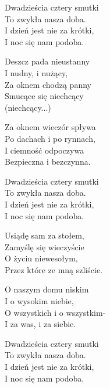\begin{text}
    Dwadzieścia cztery smutki\\
    To zwykła nasza doba.\\
    I dzień jest nie za krótki,\\
    I noc się nam podoba.

    Deszcz pada nieustanny\\
    I nudny, i nużący,\\
    Za oknem chodzą panny\\
    Smucące się niechcący\\
    (niechcący...)

    Za oknem wieczór spływa\\
    Po dachach i po rynnach,\\
    I ciemność odpoczywa\\
    Bezpieczna i bezczynna.

    Dwadzieścia cztery smutki\\
    To zwykła nasza doba.\\
    I dzień jest nie za krótki,\\
    I noc się nam podoba.

    Usiądę sam za stołem,\\
    Zamyślę się wieczyście\\
    O życiu niewesołym,\\
    Przez które ze mną szliście.

    O naszym domu niskim\\
    I o wysokim niebie,\\
    O wszystkich i o wszystkim-\\
    I za was, i za siebie.

    Dwadzieścia cztery smutki\\
    To zwykła nasza doba.\\
    I dzień jest nie za krótki,\\
    I noc się nam podoba.
\end{text}
\begin{chord}

\end{chord}